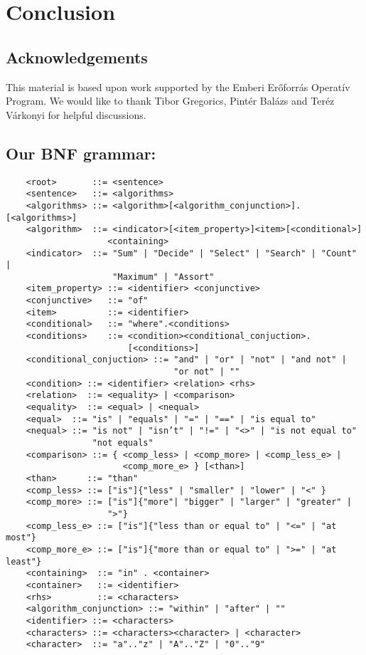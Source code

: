 \documentclass[12pt]{article}
\begin{document}
\section{Conclusion}
    \blindtext[1]
    \subsection*{Acknowledgements}
      This  material  is  based  upon  work  supported  by the Emberi Erőforrás Operatív Program. We would like to thank Tibor Gregorics, Pintér Balázs and Teréz Várkonyi for helpful discussions.

 


\newpage

\begin{appendices}
    \section{Our BNF grammar:}\label{bnf_grammar}
    \begingroup \fontsize{10pt}{9pt}\selectfont
    \begin{verbatim}
    <root>       ::= <sentence>
    <sentence>   ::= <algorithms>
    <algorithms> ::= <algorithm>[<algorithm_conjunction>].[<algorithms>]
    <algorithm>  ::= <indicator>[<item_property>]<item>[<conditional>]
                    <containing>
    <indicator>  ::= "Sum" | "Decide" | "Select" | "Search" | "Count" |
                     "Maximum" | "Assort"
    <item_property> ::= <identifier> <conjunctive>
    <conjunctive>   ::= "of"
    <item>          ::= <identifier>
    <conditional>   ::= "where".<conditions>
    <conditions>    ::= <condition><conditional_conjuction>.
                        [<conditions>]
    <conditional_conjuction> ::= "and" | "or" | "not" | "and not" |
                                 "or not" | ""
    <condition> ::= <identifier> <relation> <rhs>
    <relation>  ::= <equality> | <comparison>
    <equality>  ::= <equal> | <nequal>
    <equal>  ::= "is" | "equals" | "=" | "==" | "is equal to"
    <nequal> ::= "is not" | "isn’t" | "!=" | "<>" | "is not equal to"
                 "not equals"
    <comparison> ::= { <comp_less> | <comp_more> | <comp_less_e> |
                       <comp_more_e> } [<than>]
    <than>      ::= "than"
    <comp_less> ::= ["is"]{"less" | "smaller" | "lower" | "<" }
    <comp_more> ::= ["is"]{"more"| "bigger" | "larger" | "greater" |
                    ">"}
    <comp_less_e> ::= ["is"]{"less than or equal to" | "<=" | "at most"}
    <comp_more_e> ::= ["is"]{"more than or equal to" | ">=" | "at least"}
    <containing>  ::= "in" . <container>
    <container>   ::= <identifier>
    <rhs>         ::= <characters>
    <algorithm_conjunction> ::= "within" | "after" | ""
    <identifier> ::= <characters>
    <characters> ::= <characters><character> | <character>
    <character>  ::= "a".."z" | "A".."Z" | "0".."9"  
\end{verbatim}  
\endgroup
\end{appendices}
\end{document}
